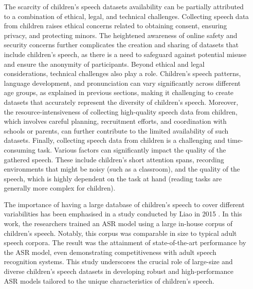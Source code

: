 The scarcity of children's speech datasets availability can be partially attributed to a combination of ethical, legal, and technical challenges. Collecting speech data from children raises ethical concerns related to obtaining consent, ensuring privacy, and protecting minors. The heightened awareness of online safety and security concerns further complicates the creation and sharing of datasets that include children's speech, as there is a need to safeguard against potential misuse and ensure the anonymity of participants.
Beyond ethical and legal considerations, technical challenges also play a role. Children's speech patterns, language development, and pronunciation can vary significantly across different age groups, as explained in previous sections, making it challenging to create datasets that accurately represent the diversity of children's speech. Moreover, the resource-intensiveness of collecting high-quality speech data from children, which involves careful planning, recruitment efforts, and coordination with schools or parents, can further contribute to the limited availability of such datasets.
Finally, collecting speech data from children is a challenging and time-consuming task. Various factors can significantly impact the quality of the gathered speech. These include children's short attention spans, recording environments that might be noisy (such as a classroom), and the quality of the speech, which is highly dependent on the task at hand (reading tasks are generally more complex for children).

The importance of having a large database of children's speech to cover different variabilities has been emphasised in a study conducted by Liao in 2015 \cite{asr-google}. In this work, the researchers trained an ASR model using a large in-house corpus of children's speech. Notably, this corpus was comparable in size to typical adult speech corpora. The result was the attainment of state-of-the-art performance by the ASR model, even demonstrating competitiveness with adult speech recognition systems. This study underscores the crucial role of large-size and diverse children's speech datasets in developing robust and high-performance ASR models tailored to the unique characteristics of children's speech.



